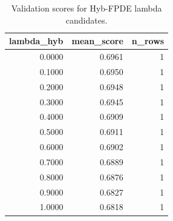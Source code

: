 \begin{table}[t]
\caption{Validation scores for Hyb-FPDE lambda candidates.}
\label{tab:lambda_distribution_computed}
\centering
\begin{tabular}{rrr}
\toprule
lambda\_hyb & mean\_score & n\_rows \\
\midrule
0.0000 & 0.6961 & 1 \\
0.1000 & 0.6950 & 1 \\
0.2000 & 0.6948 & 1 \\
0.3000 & 0.6945 & 1 \\
0.4000 & 0.6909 & 1 \\
0.5000 & 0.6911 & 1 \\
0.6000 & 0.6902 & 1 \\
0.7000 & 0.6889 & 1 \\
0.8000 & 0.6876 & 1 \\
0.9000 & 0.6827 & 1 \\
1.0000 & 0.6818 & 1 \\
\bottomrule
\end{tabular}

\end{table}

